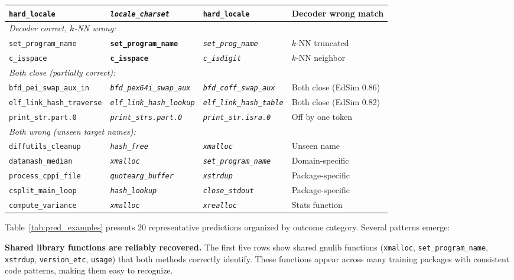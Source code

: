\documentclass[sigconf,nonacm]{acmart}
\begin{document}
\begin{table}[t]
{\begin{tabular}{llll}
        \texttt{hard\_locale} & \textit{\texttt{locale\_charset}} & \textbf{\texttt{hard\_locale}} & Decoder wrong match \\
        \midrule
        \multicolumn{4}{l}{\textit{Decoder correct, $k$-NN wrong:}} \\
        \texttt{set\_program\_name} & \textbf{\texttt{set\_program\_name}} & \textit{\texttt{set\_prog\_name}} & $k$-NN truncated \\
        \texttt{c\_isspace} & \textbf{\texttt{c\_isspace}} & \textit{\texttt{c\_isdigit}} & $k$-NN neighbor \\
        \midrule
        \multicolumn{4}{l}{\textit{Both close (partially correct):}} \\
        \texttt{bfd\_pei\_swap\_aux\_in} & \textit{\texttt{bfd\_pex64i\_swap\_aux}} & \textit{\texttt{bfd\_coff\_swap\_aux}} & Both close (EdSim 0.86) \\
        \texttt{elf\_link\_hash\_traverse} & \textit{\texttt{elf\_link\_hash\_lookup}} & \textit{\texttt{elf\_link\_hash\_table}} & Both close (EdSim 0.82) \\
        \texttt{print\_str.part.0} & \textit{\texttt{print\_strs.part.0}} & \textit{\texttt{print\_str.isra.0}} & Off by one token \\
        \midrule
        \multicolumn{4}{l}{\textit{Both wrong (unseen target names):}} \\
        \texttt{diffutils\_cleanup} & \textit{\texttt{hash\_free}} & \textit{\texttt{xmalloc}} & Unseen name \\
        \texttt{datamash\_median} & \textit{\texttt{xmalloc}} & \textit{\texttt{set\_program\_name}} & Domain-specific \\
        \texttt{process\_cppi\_file} & \textit{\texttt{quotearg\_buffer}} & \textit{\texttt{xstrdup}} & Package-specific \\
        \texttt{csplit\_main\_loop} & \textit{\texttt{hash\_lookup}} & \textit{\texttt{close\_stdout}} & Package-specific \\
        \texttt{compute\_variance} & \textit{\texttt{xmalloc}} & \textit{\texttt{xrealloc}} & Stats function \\
        \bottomrule
    \end{tabular}%
    }
\end{table}

Table~\ref{tab:pred_examples} presents 20 representative predictions organized by outcome category. Several patterns emerge:

\textbf{Shared library functions are reliably recovered.} The first five rows show shared gnulib functions (\texttt{xmalloc}, \texttt{set\_program\_name}, \texttt{xstrdup}, \texttt{version\_etc}, \texttt{usage}) that both methods correctly identify. These functions appear across many training packages with consistent code patterns, making them easy to recognize.
\end{document}
